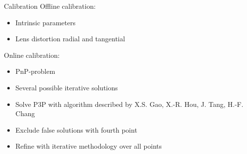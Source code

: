 
\begin{frame}{Calibration}
	Offline calibration:
	\begin{itemize}
	\item Intrinsic parameters
	\item Lens distortion radial and tangential
	\end{itemize}
	Online calibration:
	\begin{itemize}
	\item PnP-problem
	\item Several possible iterative solutions
	\item Solve P3P with algorithm described by X.S. Gao, X.-R. Hou, J. Tang, H.-F. Chang
	\item Exclude false solutions with fourth point
	\item Refine with iterative methodology over all points
	\end{itemize}	
\end{frame}
